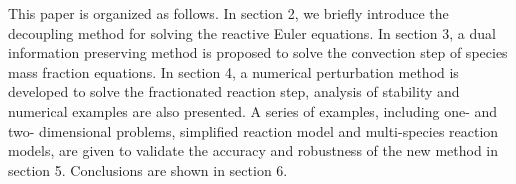 \documentclass[review]{elsarticle}
\theoremstyle{plain}\newtheorem{definition}{\sc{Definition}}
\theoremstyle{defination}\newtheorem{example}{Example}[section]
\numberwithin{equation}{section}
\numberwithin{table}{section}
\begin{document}
{This paper is organized as follows. In section 2, we briefly introduce the decoupling method for solving the reactive Euler equations. In section 3, a dual information preserving method is proposed to solve the convection step of species mass fraction equations. In section 4, a numerical perturbation method is developed to solve the fractionated reaction step, analysis of stability and numerical examples are also presented. A series of examples, including one- and two- dimensional problems, simplified reaction model and multi-species reaction models, are given to validate the accuracy and robustness of the new method in section 5. Conclusions are shown in section 6.
}
\end{document}
